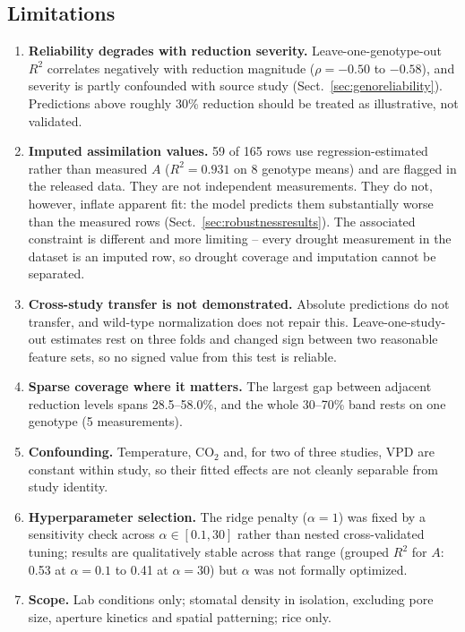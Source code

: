 \documentclass[runningheads]{llncs}
\begin{document}
\subsection{Limitations}\label{sec:limitations}
\begin{enumerate}
    \item \textbf{Reliability degrades with reduction severity.} Leave-one-genotype-out $R^{2}$ correlates negatively with reduction magnitude ($\rho=-0.50$ to $-0.58$), and severity is partly confounded with source study (Sect.~\ref{sec:genoreliability}). Predictions above roughly 30\% reduction should be treated as illustrative, not validated.
    \item \textbf{Imputed assimilation values.} 59 of 165 rows use regression-estimated rather than measured $A$ ($R^{2}=0.931$ on 8 genotype means) and are flagged in the released data. They are not independent measurements. They do not, however, inflate apparent fit: the model predicts them substantially worse than the measured rows (Sect.~\ref{sec:robustnessresults}). The associated constraint is different and more limiting -- every drought measurement in the dataset is an imputed row, so drought coverage and imputation cannot be separated.
    \item \textbf{Cross-study transfer is not demonstrated.} Absolute predictions do not transfer, and wild-type normalization does not repair this. Leave-one-study-out estimates rest on three folds and changed sign between two reasonable feature sets, so no signed value from this test is reliable.
    \item \textbf{Sparse coverage where it matters.} The largest gap between adjacent reduction levels spans 28.5--58.0\%, and the whole 30--70\% band rests on one genotype (5 measurements).
    \item \textbf{Confounding.} Temperature, CO$_2$ and, for two of three studies, VPD are constant within study, so their fitted effects are not cleanly separable from study identity.
    \item \textbf{Hyperparameter selection.} The ridge penalty ($\alpha=1$) was fixed by a sensitivity check across $\alpha\in[0.1,30]$ rather than nested cross-validated tuning; results are qualitatively stable across that range (grouped $R^2$ for $A$: 0.53 at $\alpha=0.1$ to 0.41 at $\alpha=30$) but $\alpha$ was not formally optimized.
    \item \textbf{Scope.} Lab conditions only; stomatal density in isolation, excluding pore size, aperture kinetics and spatial patterning; rice only.

\end{enumerate}
\end{document}
